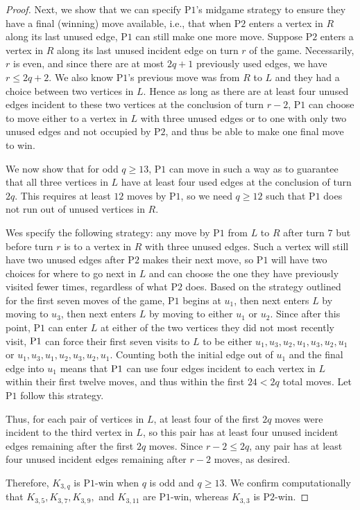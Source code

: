 \documentclass{article}
\theoremstyle{plain}
\theoremstyle{definition}
\def\pone{{\rm{P}\ensuremath{1}}}
\def\ptwo{{\rm{P}\ensuremath{2}}}
\def\poneposs{{\rm{P}\ensuremath{1}'s}}
\begin{document}
\begin{proof}
Next, we show that we can specify \poneposs{} midgame strategy to ensure they have a final (winning) move available, i.e., that when \ptwo{} enters a vertex in $R$ along its last unused edge, \pone{} can still make one more move. Suppose \ptwo{} enters a vertex in $R$ along its last unused incident edge on turn $r$ of the game. Necessarily, $r$ is even, and since there are at most $2q+1$ previously used edges, we have $r \le 2q+2$. We also know \pone{}'s previous move was from $R$ to $L$ and they had a choice between two vertices in $L$. Hence as long as there are at least four unused edges incident to these two vertices at the conclusion of turn $r-2$, \pone{} can choose to move either to a vertex in $L$ with three unused edges or to one with only two unused edges and not occupied by \ptwo{}, and thus be able to make one final move to win.

We now show that for odd $q \ge 13$, \pone{} can move in such a way as to guarantee that all three vertices in $L$ have at least four used edges at the conclusion of turn $2q$. This requires at least $12$ moves by \pone{}, so we need $q \ge 12$ such that \pone{} does not run out of unused vertices in $R$. 

Wes specify the following strategy: any move by \pone{} from $L$ to $R$ after turn $7$ but before turn $r$ is to a vertex in $R$ with three unused edges. Such a vertex will still have two unused edges after \ptwo{} makes their next move, so \pone{} will have two choices for where to go next in $L$ and can choose the one they have previously visited fewer times, regardless of what \ptwo{} does. Based on the strategy outlined for the first seven moves of the game, \pone{} begins at $u_1$, then next enters $L$ by moving to $u_3$, then next enters $L$ by moving to either $u_1$ or $u_2$. Since after this point, \pone{} can enter $L$ at either of the two vertices they did not most recently visit, $\pone{}$ can force their first seven visits to $L$ to be either $u_1,u_3,u_2,u_1,u_3,u_2,u_1$ or $u_1,u_3,u_1,u_2,u_3,u_2,u_1$. Counting both the initial edge out of $u_1$ and the final edge into $u_1$ means that $\pone{}$ can use four edges incident to each vertex in $L$ within their first twelve moves, and thus within the first $24< 2q$ total moves. Let \pone{} follow this strategy. 

Thus, for each pair of vertices in $L$, at least four of the first $2q$ moves were incident to the third vertex in $L$, so this pair has at least four unused incident edges remaining after the first $2q$ moves. Since $r-2\le 2q$, any pair has at least four unused incident edges remaining after $r-2$ moves, as desired.

Therefore, $K_{3,q}$ is \pone{}-win when $q$ is odd and $q \ge 13$. We confirm computationally that $K_{3,5},K_{3,7},K_{3,9},$ and $K_{3,11}$ are \pone{}-win, whereas $K_{3,3}$ is \ptwo{}-win.
\end{proof}
\end{document}
